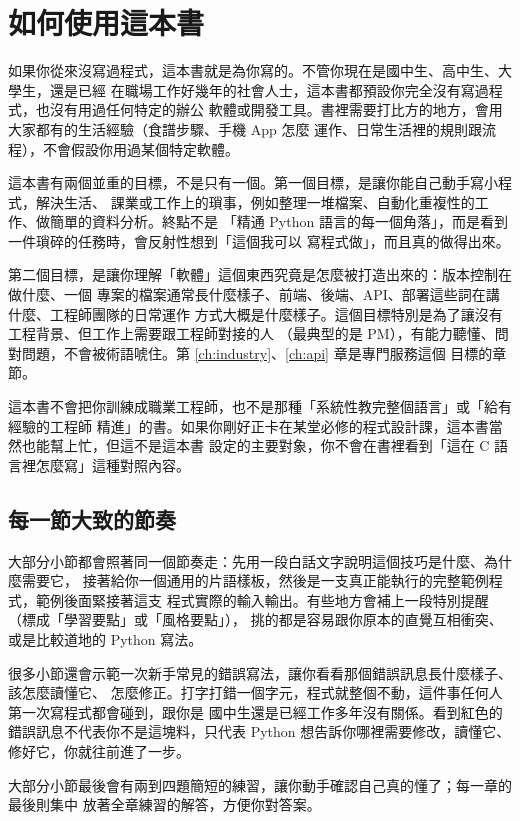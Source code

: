 \chapter*{如何使用這本書}

如果你從來沒寫過程式，這本書就是為你寫的。不管你現在是國中生、高中生、大學生，還是已經
在職場工作好幾年的社會人士，這本書都預設你完全沒有寫過程式，也沒有用過任何特定的辦公
軟體或開發工具。書裡需要打比方的地方，會用大家都有的生活經驗（食譜步驟、手機 App 怎麼
運作、日常生活裡的規則跟流程），不會假設你用過某個特定軟體。

這本書有兩個並重的目標，不是只有一個。第一個目標，是讓你能自己動手寫小程式，解決生活、
課業或工作上的瑣事，例如整理一堆檔案、自動化重複性的工作、做簡單的資料分析。終點不是
「精通 Python 語言的每一個角落」，而是看到一件瑣碎的任務時，會反射性想到「這個我可以
寫程式做」，而且真的做得出來。

第二個目標，是讓你理解「軟體」這個東西究竟是怎麼被打造出來的：版本控制在做什麼、一個
專案的檔案通常長什麼樣子、前端、後端、API、部署這些詞在講什麼、工程師團隊的日常運作
方式大概是什麼樣子。這個目標特別是為了讓沒有工程背景、但工作上需要跟工程師對接的人
（最典型的是 PM），有能力聽懂、問對問題，不會被術語唬住。第 \ref{ch:industry}、\ref{ch:api} 章是專門服務這個
目標的章節。

這本書不會把你訓練成職業工程師，也不是那種「系統性教完整個語言」或「給有經驗的工程師
精進」的書。如果你剛好正卡在某堂必修的程式設計課，這本書當然也能幫上忙，但這不是這本書
設定的主要對象，你不會在書裡看到「這在 C 語言裡怎麼寫」這種對照內容。

\section*{每一節大致的節奏}

大部分小節都會照著同一個節奏走：先用一段白話文字說明這個技巧是什麼、為什麼需要它，
接著給你一個通用的片語樣板，然後是一支真正能執行的完整範例程式，範例後面緊接著這支
程式實際的輸入輸出。有些地方會補上一段特別提醒（標成「學習要點」或「風格要點」），
挑的都是容易跟你原本的直覺互相衝突、或是比較道地的 Python 寫法。

很多小節還會示範一次新手常見的錯誤寫法，讓你看看那個錯誤訊息長什麼樣子、該怎麼讀懂它、
怎麼修正。打字打錯一個字元，程式就整個不動，這件事任何人第一次寫程式都會碰到，跟你是
國中生還是已經工作多年沒有關係。看到紅色的錯誤訊息不代表你不是這塊料，只代表 Python
想告訴你哪裡需要修改，讀懂它、修好它，你就往前進了一步。

大部分小節最後會有兩到四題簡短的練習，讓你動手確認自己真的懂了；每一章的最後則集中
放著全章練習的解答，方便你對答案。

